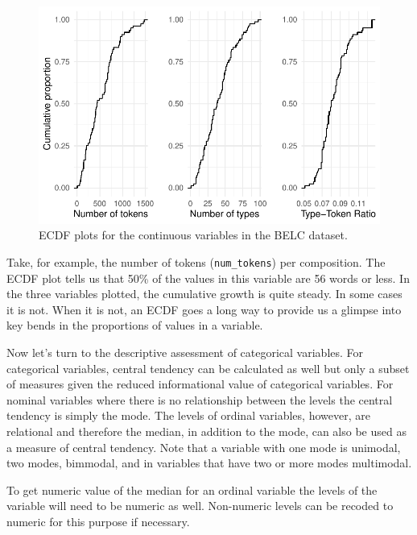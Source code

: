 \documentclass[
  letterpaper,
]{scrbook}
\begin{document}
\begin{figure}[h]

{\centering \includegraphics{./approaching-analysis_files/figure-pdf/fig-summarize-ecdf-belc-1.pdf}

}

\caption{\label{fig-summarize-ecdf-belc}ECDF plots for the continuous
variables in the BELC dataset.}

\end{figure}

Take, for example, the number of tokens (\texttt{num\_tokens}) per
composition. The ECDF plot tells us that 50\% of the values in this
variable are 56 words or less. In the three variables plotted, the
cumulative growth is quite steady. In some cases it is not. When it is
not, an ECDF goes a long way to provide us a glimpse into key bends in
the proportions of values in a variable.

Now let's turn to the descriptive assessment of categorical variables.
For categorical variables, central tendency can be calculated as well
but only a subset of measures given the reduced informational value of
categorical variables. For nominal variables where there is no
relationship between the levels the central tendency is simply the mode.
The levels of ordinal variables, however, are relational and therefore
the median, in addition to the mode, can also be used as a measure of
central tendency. Note that a variable with one mode is unimodal, two
modes, bimmodal, and in variables that have two or more modes
multimodal.

\begin{tcolorbox}[enhanced jigsaw, title=\textcolor{quarto-callout-warning-color}{\faExclamationTriangle}\hspace{0.5em}{Tip}, titlerule=0mm, toptitle=1mm, colbacktitle=quarto-callout-warning-color!10!white, bottomtitle=1mm, left=2mm, colframe=quarto-callout-warning-color-frame, breakable, toprule=.15mm, colback=white, opacitybacktitle=0.6, leftrule=.75mm, rightrule=.15mm, bottomrule=.15mm, arc=.35mm, coltitle=black, opacityback=0]

To get numeric value of the median for an ordinal variable the levels of
the variable will need to be numeric as well. Non-numeric levels can be
recoded to numeric for this purpose if necessary.

\end{tcolorbox}
\end{document}
